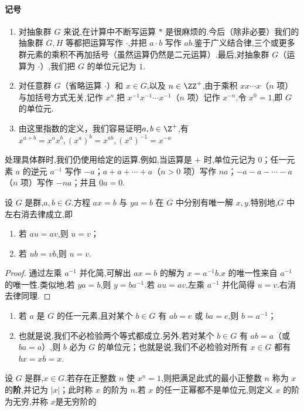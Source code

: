 \paragraph{记号}
\begin{enumerate}[label=(\arabic*)]
	\item 对抽象群 $G$ 来说,在计算中不断写运算 $*$ 是很麻烦的.今后（除非必要）我们的抽象群 $G,H$ 等都把运算写作 $\cdot$,并把 $a\cdot b$ 写作 $ab$.鉴于广义结合律,三个或更多群元素的乘积不再加括号（虽然运算仍然是二元运算）.最后,对抽象群 $G$（运算为 $\cdot$）,我们把 $G$ 的单位元记为 $1$.
	\item 对任意群 $G$（省略运算 $\cdot$）和 $x\in G$,以及 $n\in\ZZ^+$,由于乘积 $xx\cdots x$（$n$ 项）与加括号方式无关,记作 $x^n$.把 $x^{-1}x^{-1}\cdots x^{-1}$（$n$ 项）记作 $x^{-n}$.令 $x^0=1$,即 $G$ 的单位元.
	\item  由这里指数的定义，我们容易证明$a,b\in \Z^+$,有 $x^{a+b}= x^a x^b,(x^a)^b = x^{ab},(x^a)^{-1} = x^{-a}$
\end{enumerate}

处理具体群时,我们仍使用给定的运算.例如,当运算是 $+$ 时,单位元记为 $0$；任一元素 $a$ 的逆元 $a^{-1}$ 写作 $-a$；$a+a+\cdots+a$（$n>0$ 项）写作 $na$；$-a-a-\cdots-a$（$n$ 项）写作 $-na$；并且 $0a=0$.

\begin{proposition}
	 设 $G$ 是群,$a,b\in G$.方程 $ax=b$ 与 $ya=b$ 在 $G$ 中分别有唯一解 $x,y$.特别地,$G$ 中左右消去律成立,即
\begin{enumerate}[label=(\arabic*)]
	\item 若 $au=av$,则 $u=v$；
	\item 若 $ub=vb$,则 $u=v$.
\end{enumerate}

\end{proposition}
\begin{proof}
	通过左乘 $a^{-1}$ 并化简,可解出 $ax=b$ 的解为 $x=a^{-1}b$.$x$ 的唯一性来自 $a^{-1}$ 的唯一性.类似地,若 $ya=b$,则 $y=ba^{-1}$.若 $au=av$,左乘 $a^{-1}$ 并化简得 $u=v$.右消去律同理.
\end{proof}
\begin{corollary}
	\begin{enumerate}[label=(\arabic*)]
		\item 若 $a$ 是 $G$ 的任一元素,且对某个 $b\in G$ 有 $ab=e$ 或 $ba=e$,则 $b=a^{-1}$；
		\item 也就是说,我们不必检验两个等式都成立.另外,若对某个 $b\in G$ 有 $ab=a$（或 $ba=a$）,则 $b$ 必为 $G$ 的单位元；也就是说,我们不必检验对所有 $x\in G$ 都有 $bx=xb=x$.
	\end{enumerate}
\end{corollary}
\begin{definition}
设 $G$ 是群,$x\in G$.若存在正整数 $n$ 使 $x^n=1$,则把满足此式的最小正整数 $n$ 称为 $x$ 的\textbf{阶},并记为 $|x|$；此时称 $x$ 的阶为 $n$.若 $x$ 的任一正幂都不是单位元,则定义 $x$ 的阶为无穷,并称 $x$是无穷阶的
\end{definition}

